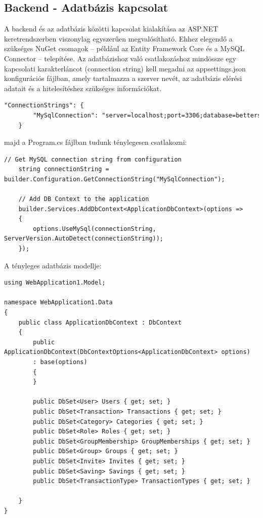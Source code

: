 \subsection{Backend - Adatbázis kapcsolat}
A backend és az adatbázis közötti kapcsolat kialakítása az ASP.NET keretrendszerben viszonylag egyszerűen megvalósítható. Ehhez elegendő a szükséges NuGet csomagok – például az Entity Framework Core és a MySQL Connector – telepítése. Az adatbázishoz való csatlakozáshoz mindössze egy kapcsolati karakterláncot (connection string) kell megadni az appsettings.json konfigurációs fájlban, amely tartalmazza a szerver nevét, az adatbázis elérési adatait és a hitelesítéshez szükséges információkat.

\begin{lstlisting}[language={HTML}]
	"ConnectionStrings": {
		"MySqlConnection": "server=localhost;port=3306;database=betterspend;user=root;password=<<password>>;"
	}
\end{lstlisting}

majd a Program.cs fájlban tudunk ténylegesen csatlakozni:

\begin{lstlisting}[language={[Sharp]C}]
	// Get MySQL connection string from configuration
	string connectionString = builder.Configuration.GetConnectionString("MySqlConnection");
	
	// Add DB Context to the application
	builder.Services.AddDbContext<ApplicationDbContext>(options =>
	{
		options.UseMySql(connectionString, ServerVersion.AutoDetect(connectionString));
	});
\end{lstlisting}

A tényleges adatbázis modellje:

\begin{lstlisting}[language={[Sharp]C}]
using WebApplication1.Model;

namespace WebApplication1.Data
{
	public class ApplicationDbContext : DbContext
	{
		public ApplicationDbContext(DbContextOptions<ApplicationDbContext> options)
		: base(options)
		{
		}
		
		public DbSet<User> Users { get; set; }
		public DbSet<Transaction> Transactions { get; set; }
		public DbSet<Category> Categories { get; set; }
		public DbSet<Role> Roles { get; set; }
		public DbSet<GroupMembership> GroupMemberships { get; set; }
		public DbSet<Group> Groups { get; set; }
		public DbSet<Invite> Invites { get; set; }
		public DbSet<Saving> Savings { get; set; }
		public DbSet<TransactionType> TransactionTypes { get; set; }
		
	}
}
\end{lstlisting}

